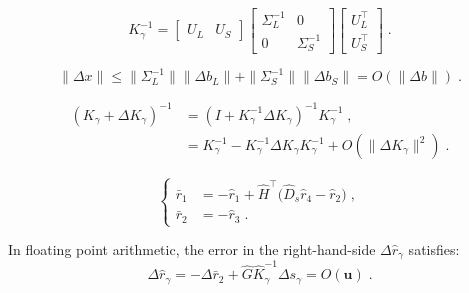 \documentclass[10pt,a4paper]{amsart}
\newcommand{\epstol}{\mathbf{u}}
\begin{document}
\begin{equation}
  \label{eq:cond:inversecondensed}
  K_\gamma^{-1}  = \begin{bmatrix} U_L & U_S \end{bmatrix}
  \begin{bmatrix}
    \Sigma_L^{-1} & 0 \\ 0 & \Sigma_S^{-1}
  \end{bmatrix}
  \begin{bmatrix}
    U_L^\top \\ U_S^\top
  \end{bmatrix}
  \; .
\end{equation}

\begin{equation}
  \label{eq:cond:rhserrorfull}
  \| \Delta x \|
  \leq  \| \Sigma_L^{-1} \| \| \Delta b_L \| + \| \Sigma_S^{-1} \| \| \Delta b_S \| =
  O(\|\Delta b \|) \; .
\end{equation}

\begin{equation}
  \label{eq:cond:invperturbed}
  \begin{aligned}
    (K_\gamma + \Delta K_\gamma)^{-1} &= (I + K_\gamma^{-1} \Delta K_\gamma)^{-1} K_\gamma^{-1} \; , \\
                                      &= K_\gamma^{-1} - K_\gamma^{-1}\Delta K_\gamma K_\gamma^{-1} + O(\|\Delta K_\gamma\|^2) \; .
  \end{aligned}
\end{equation}

\begin{equation}
  \label{eq:cond:condensedrhs}
  \left\{
  \begin{aligned}
    \bar{r}_1 &= - \widehat{r}_1 + \widehat{H}^\top\big(\widehat{D}_{s} \widehat{r}_{4} - \widehat{r}_{2} \big) \;, \\
     \bar{r}_2 &= -\widehat{r}_3 \; .
  \end{aligned}
  \right.
\end{equation}

\begin{proposition}
In floating point arithmetic, the error in the right-hand-side $\Delta \widehat{r}_\gamma$ satisfies:
\begin{equation}
  \label{eq:cond:errorrgamma}
  \Delta \widehat{r}_\gamma = -\Delta \bar{r}_2 + \widehat{G} \widehat{K}_\gamma^{-1} \Delta s_\gamma = O(\epstol) \;.
\end{equation}
\end{proposition}
\end{document}
